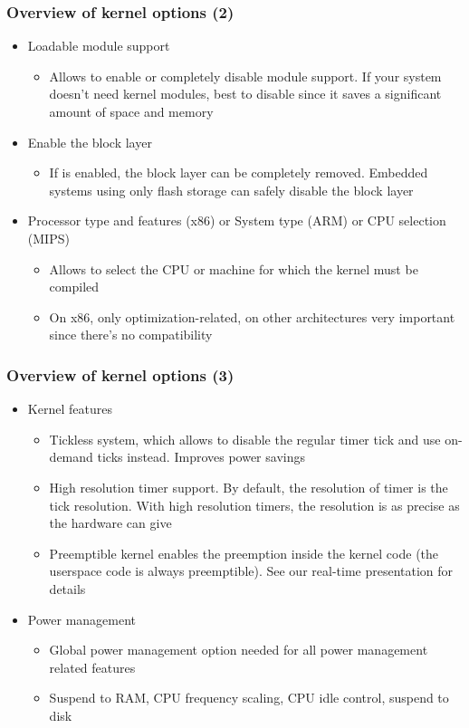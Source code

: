 \begin{frame}
  \frametitle{Overview of kernel options (2)}
  \begin{itemize}
  \item Loadable module support
    \begin{itemize}
    \item Allows to enable or completely disable module support. If
      your system doesn't need kernel modules, best to disable since
      it saves a significant amount of space and memory
    \end{itemize}
  \item Enable the block layer
    \begin{itemize}
    \item If  is enabled, the block layer can be
      completely removed. Embedded systems using only flash storage
      can safely disable the block layer
    \end{itemize}
  \item Processor type and features (x86) or System type (ARM) or CPU selection
    (MIPS)
    \begin{itemize}
    \item Allows to select the CPU or machine for which the kernel
      must be compiled
    \item On x86, only optimization-related, on other architectures
      very important since there's no compatibility
    \end{itemize}
  \end{itemize}
\end{frame}

\begin{frame}
  \frametitle{Overview of kernel options (3)}
  \begin{itemize}
  \item Kernel features
    \begin{itemize}
    \item Tickless system, which allows to disable the regular timer
      tick and use on-demand ticks instead. Improves power savings
    \item High resolution timer support. By default, the resolution of
      timer is the tick resolution. With high resolution timers, the
      resolution is as precise as the hardware can give
    \item Preemptible kernel enables the preemption inside the kernel
      code (the userspace code is always preemptible). See our
      real-time presentation for details
    \end{itemize}
  \item Power management
    \begin{itemize}
    \item Global power management option needed for all power
      management related features
    \item Suspend to RAM, CPU frequency scaling, CPU idle control,
      suspend to disk
    \end{itemize}
  \end{itemize}
\end{frame}

